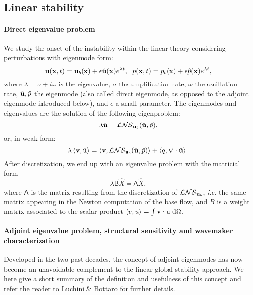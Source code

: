 \documentclass[twocolumn,10pt]{asme2ej}
\newcommand{\be}[1]{ \begin{equation} \label{#1}}
\newcommand{\ee}{\end{equation}}
\begin{document}
\subsection{Linear stability}
\vspace{.2cm}

\paragraph{Direct eigenvalue problem}
We study the onset of the instability within the linear theory considering perturbations with eigenmode form:
\be{startmodepropre}
{\bf u} ({\bf{x}},t) = {\bf u}_b({\bf{x}}) + \epsilon \hat{\bf u}({\bf{x}}) e^{\lambda t}, \,\,\,\, {p}({\bf{x}},t) = {p}_b({\bf{x}}) + \epsilon \hat{p}({\bf{x}}) e^{\lambda t},
\ee
where $\lambda = \sigma + i \omega$ is the eigenvalue, $\sigma$ the amplification rate,
$\omega$ the oscillation rate, $\hat{{\bf u}},\hat{p}$ the eigenmode (also called direct eigenmode, as opposed to the adjoint eigenmode introduced below), 
and $\epsilon$ a small parameter. The eigenmodes and eigenvalues are the solution of the following eigenproblem:
 \be{LEP}
\lambda \hat{{\bf u}} = {\cal LNS}_{{\bf u}_b}( \hat{\bf u},\hat{p}),
\ee
or, in weak form: 
\be{eigenvalueproblem}
\lambda \left< {\bf v} , \hat{{\bf u}} \right> = \left< {\bf v}, {\cal LNS}_{{\bf u}_b} ( \hat{\bf u},\hat{p})\right> + \left< q, \nabla \cdot \hat{\bf u} \right>.
\ee
After discretization, we end up with an eigenvalue problem with the matricial form
\be{Eigen_matricial}
\lambda {\mathsf{B}} \hat{X} = {\mathsf{A}} \hat{X},
\ee
where ${\mathsf{A}}$ is the matrix resulting from the discretization of ${\cal LNS}_{{\bf u}_b}$, \textit{i.e.} the same matrix  appearing in the Newton computation of the base flow, and  $B$ is a weight matrix associated to the scalar product $\left<v,u\right> = \int \overline{\bf v} \cdot {\bf u} \mbox{ d} \Omega$.

\paragraph{Adjoint eigenvalue problem, structural sensitivity and wavemaker characterization}
Developed in the two past decades, the concept of adjoint eigenmodes has now become an unavoidable complement to the linear global stability approach. We here give a short summary of the definition and usefulness of this concept and refer the reader to Luchini \& Bottaro\cite{LucBott2014} for further details.
\end{document}
